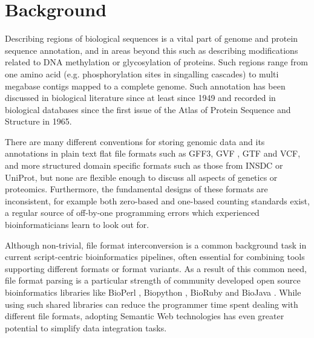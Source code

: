 \section*{Background}
Describing regions of biological sequences is a vital part of genome and protein sequence
annotation, and in areas beyond this such as describing modifications related to DNA methylation
or glycosylation of proteins.
Such regions range from one amino acid (e.g. phosphorylation sites in
singalling cascades) to multi megabase contigs mapped to a complete genome.
Such annotation has been discussed in biological literature since at least since 1949\cite{Sanger1949} and recorded in biological databases since the first issue of the Atlas of Protein Sequence and Structure\cite{dayhoff1965atlas} in 1965.

There are many different conventions for storing genomic data and its
annotations in plain text flat file formats such as GFF3, GVF
\cite{GVF}, GTF and VCF, and more structured domain specific formats
such as those from INSDC or UniProt, but none are flexible enough to
discuss all aspects of genetics or proteomics.
Furthermore, the fundamental designs of these formats are
inconsistent, for example both zero-based and one-based counting
standards exist, a regular source of off-by-one programming errors
which experienced bioinformaticians learn to look out for.

Although non-trivial, file format interconversion is a common background task
in current script-centric bioinformatics pipelines, often essential for combining
tools supporting different formats or format variants. 
As a result of this common need, file format parsing is a particular strength of
community developed open source bioinformatics libraries like BioPerl
\cite{BioPerl2002}, Biopython \cite{Biopython2009}, BioRuby \cite{BioRuby2010}
and BioJava \cite{BioJava2012}. While using such shared libraries can reduce the
programmer time spent dealing with different file formats, adopting Semantic
Web technologies has even greater potential to simplify data integration tasks.

